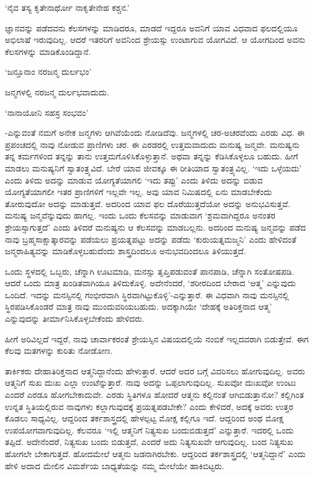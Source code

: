 \begin{shloka}
`ನೈವ ತಸ್ಯ ಕೃತೇನಾರ್ಥೋ ನಾಕೃತೇನೇಹ ಕಶ್ಚನ.'
\end{shloka}

ಜ್ಞಾನವನ್ನು ಪಡೆದವನು ಕೆಲಸಗಳನ್ನು ಮಾಡಿದರೂ, ಮಾಡದೆ ಇದ್ದರೂ ಅವನಿಗೆ ಯಾವ ವಿಧವಾದ ಫಲದಲ್ಲಿಯೂ ಅಭಿಲಾಷೆ ಇರುವುದಿಲ್ಲ. ಆದರೆ ಇತರರಿಗೆ ಅವನಿಂದ ಶ್ರೇಯಸ್ಸು ಉಂಟಾಗುವ ಯೋಗವಿದೆ. ಆ ಯೋಗದಿಂದ ಅವನು ಕೆಲಸಗಳನ್ನು ಮಾಡಿಕೊಂಡಿದ್ದಾನೆ.

\begin{shloka}
`ಜನ್ತೂನಾಂ ನರಜನ್ಮ ದುರ್ಲಭಂ'
\end{shloka}

ಜನ್ಮಗಳಲ್ಲಿ ನರಜನ್ಮ ದುರ್ಲಭವಾದುದು.

\begin{shloka}
`ನಾನಾಯೋನಿ ಸಹಸ್ರ ಸಂಭವಂ'
\end{shloka}

-ಎನ್ನುವಂತೆ ನಮಗೆ ಅನೇಕ ಜನ್ಮಗಳು ಆಗಿವೆಯೆಂದು ನೋಡಿದೆವು. ಜನ್ಮಗಳಲ್ಲಿ ಚರ-ಅಚರವೆಂದು ಎರಡು ವಿಧ. ಈ ಪ್ರಪಂಚದಲ್ಲಿ ನಾವು ನೋಡುವ ಪ್ರಾಣಿಗಳು ಚರ. ಈ ಎರಡರಲ್ಲಿ ಉತ್ತಮವಾದುದು ಮನುಷ್ಯ ಜನ್ಮವೇ. ಮನುಷ್ಯನು ತನ್ನ ಕರ್ಮಗಳಿಂದ ತನ್ನನ್ನು ತಾನು ಉತ್ತಮಗೊಳಿಸಿಕೊಳ್ಳುತ್ತಾನೆ. ಅಥವಾ ತನ್ನನ್ನು ಕೆಡಿಸಿಕೊಳ್ಳಲೂ ಬಹುದು. ಹೀಗೆ ಮಾಡಲು ಮನುಷ್ಯನಿಗೆ ಸ್ವಾತಂತ್ರ್ಯವಿದೆ. ಬೇರೆ ಯಾವ ಜೀವಕ್ಕೂ ಈ ರೀತಿಯಾದ ಸ್ವಾತಂತ್ರ್ಯವಿಲ್ಲ. `ಇದು ಒಳ್ಳೆಯದು' ಎಂದು ತಿಳಿದು ಅದನ್ನು ಮಾಡುವ ಯೋಗ್ಯತೆಯಾಗಲಿ `ಇದು ತಪ್ಪು' ಎಂದು ತಿಳಿದು ಅದನ್ನು ಬಿಡುವ ಯೋಗ್ಯತೆಯಾಗಲೀ ಇತರ ಪ್ರಾಣಿಗಳಿಗೆ ಇಲ್ಲವೇ ಇಲ್ಲ. ಅವು ಯಾವ ನಿಮಿಷದಲ್ಲಿ ಏನು ಮಾಡಬೇಕೆಂದು ತೋರುವುದೋ ಅದನ್ನು ಮಾಡುತ್ತವೆ. ಅದರಿಂದ ಯಾವ ಫಲ ದೊರೆಯುತ್ತದೆಯೋ ಅದನ್ನು ಅನುಭವಿಸುತ್ತವೆ. ಮನುಷ್ಯ ಜನ್ಮವೆನ್ನುವುದು ಹಾಗಲ್ಲ. ಇಂದು ಒಂದು ಕೆಲಸವನ್ನು ಮಾಡುವಾಗ `ಶ್ರಮವಾಗಿದ್ದರೂ ಅನಂತರ ಶ್ರೇಯಸ್ಸಾಗುತ್ತದೆ' ಎಂದು ತಿಳಿದರೆ ಮನುಷ್ಯನು ಆ ಕೆಲಸವನ್ನು ಮಾಡಬಲ್ಲನು. ಅದರಿಂದ ಮನುಷ್ಯ ಜನ್ಮವನ್ನು  ಪಡೆದ ನಾವು ಬ್ರಹ್ಮಸಾಕ್ಷಾತ್ಕಾರವನ್ನು ಪಡೆಯಲು ಪ್ರಯತ್ನಪಟ್ಟು ಅದನ್ನು ಪಡೆದು `ಕುರುಯತ್ನಮಜ್ಮನಿ' ಎಂದು ಹೇಳಿದಂತೆ ಜನ್ಮರಾಹಿತ್ಯವನ್ನು ಮಾಡಿಕೊಳ್ಳಬಹುದೆಂದು ಶಾಸ್ತ್ರದಿಂದಲೂ ಅನುಭವದಿಂದಲೂ ತಿಳಿಯುತ್ತದೆ.

ಒಂದು ಸ್ಥಳದಲ್ಲಿ ಒಬ್ಬರು, ಚೆನ್ನಾಗಿ ಊಟಮಾಡಿ, ಮನಸ್ಸು ತೃಪ್ತಿಪಡುವಂತೆ ಪಾನಪಾಡಿ, ಚೆನ್ನಾಗಿ ಸಂತೋಷಪಡಿ. ಆದರೆ ಒಂದು ಮಾತ್ರ ಖಂಡಿತವಾಗಿಯೂ ತಿಳಿದುಕೊಳ್ಳಿ. ಅದೇನೆಂದರೆ, `ಶರೀರದಿಂದ ಬೇರಾದ `ಆತ್ಮ' ಎನ್ನುವುದು ಒಂದಿದೆ. ಇದನ್ನು ಮನಸ್ಸಿನಲ್ಲಿ ಗಂಭೀರವಾಗಿ ಸ್ಥಿರವಾಗಿಟ್ಟುಕೊಳ್ಳಿ'-ಎನ್ನುತ್ತಾರೆ. ಈ ವಿಧವಾಗಿ ನಾವು ಮನಸ್ಸಿನಲ್ಲಿ ಸ್ಥಿರಪಡಿಸಿಕೊಂಡರೆ ಮಾತ್ರ ನಾವು ಮುಂದುವರಿಯಬಹುದು. ಅದಕ್ಕಾಗಿಯೇ `ದೇಹಕ್ಕೆ ಅತಿರಿಕ್ತನಾದ ಆತ್ಮ' ಎನ್ನುವುದನ್ನು ತೀರ್ಮಾನಿಸಿಕೊಳ್ಳಬೇಕೆಂದು ಹೇಳಿದರು.

ಹೀಗೆ ಅರಿವಿಲ್ಲದೆ ಇದ್ದರೆ, ನಾವು ಚಾರ್ವಾಕರಂತೆ ಶ್ರೇಯಸ್ಸಿನ ವಿಷಯದಲ್ಲಿಯೆ ನಂಬಿಕೆ ಇಲ್ಲದವರಾಗಿ ಬಿಡುತ್ತೇವೆ. ಈಗ ಕೆಲವು ಮತಗಳನ್ನು ಕುರಿತು ನೋಡೋಣ.

ತಾರ್ಕಿಕರು ದೇಹಾತಿರಿಕ್ತನಾದ ಆತ್ಮನಿದ್ದಾನೆಂದು ಹೇಳುತ್ತಾರೆ. ಆದರೆ ಅದರ ಬಗ್ಗೆ ವಿವರಿಸಲು ಹೋಗುವುದಿಲ್ಲ. ಅವರು ಆತ್ಮನಿಗೆ ಸುಖ ದುಃಖ ಎಲ್ಲಾ ಉಂಟೆನ್ನುತ್ತಾರೆ. ನಾವು ಅದನ್ನು ಒಪ್ಪಲಾಗುವುದಿಲ್ಲ. ಸುಖವೋ ದುಃಖವೋ ಉಂಟು ಎಂದರೆ ಎರಡೂ ಹೋಗಬೇಕಾದುವೇ. ಎರಡು ಸ್ಥಿತಿಗಳೂ ಹೋದರೆ ಆತ್ಮನು ಕಲ್ಲಿನಂತೆ ಆಗಿಬಿಡುತ್ತಾನೋ? ಕಲ್ಲಿಗಿಂತ ಉನ್ನತ ಸ್ಥಿತಿಯಲ್ಲಿರುವ ನಾವುಗಳು ಕಲ್ಲಾಗುವುದಕ್ಕೆ  ಪ್ರಯತ್ನಪಡಬೇಕೇ? ಎಂದು ಕೇಳಿದರೆ, ಅದಕ್ಕೆ ಅವರು ಉತ್ತರ ಕೊಡಲು ಸಾಧ್ಯವಿಲ್ಲ. ಆದ್ದರಿಂದ ತರ್ಕಶಾಸ್ತ್ರದಲ್ಲಿ ಹೇಳಲ್ಪಟ್ಟ ಮೋಕ್ಷ ಕಲ್ಲಿಗೂ ಇದೆ. ಆದ್ದರಿಂದ ಅಂಥ ಮೋಕ್ಷ ಉಪಯೋಗವಾಗುವುದಿಲ್ಲ. ಕೆಲವರೂ `ಇಲ್ಲಿ ಆತ್ಮನಿಗೆ ನಿತ್ಯಸುಖ ಬಂದುಬಿಡುತ್ತದೆ' ಎನ್ನುತ್ತಾರೆ. ಇದರಲ್ಲಿ ಒಂದು ತಪ್ಪಿದೆ. ಅದೇನೆಂದರೆ, ನಿತ್ಯಸುಖ ಬಂದು ಬಿಡುತ್ತದೆ, ಎಂದರೆ ಅದು ನಿತ್ಯಸುಖವೇ ಆಗುವುದಿಲ್ಲ. ಬಂದ ನಿತ್ಯಸುಖ ಹೋಗಲೇ ಬೇಕಾಗುತ್ತದೆ. ಹೋದಮೇಲೆ ಆತ್ಮನು ಜಡನಾಗಿರಬೇಕು. ಆದ್ದರಿಂದ ತರ್ಕಶಾಸ್ತ್ರದಲ್ಲಿ `ಆತ್ಮನಿದ್ದಾನೆ' ಎಂದು ಹೇಳಿ ಅದಾದ ಮೇಲಿನ ವಿಮರ್ಶೆಯ ಬಾಧ್ಯತೆಯನ್ನು ನಮ್ಮ ಮೇಲೆಯೇ ಹಾಕಿಬಿಟ್ಟರು.   

